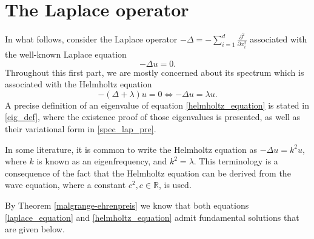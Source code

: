 \section{The Laplace operator}
\label{section:laplace_op}

In what follows, consider the Laplace operator \(-\Delta = -\sum_{i=1}^{d} \frac{\partial^2}{\partial x_i^2}\) associated with the well-known Laplace equation
\begin{equation} \label{laplace_equation}
    -\Delta u = 0.
\end{equation}
Throughout this first part, we are mostly concerned about its spectrum which is associated with the Helmholtz equation
\begin{equation} \label{helmholtz_equation}
    -(\Delta+\lambda) u = 0 \iff -\Delta u = \lambda u.
\end{equation}
A precise definition of an eigenvalue of equation \eqref{helmholtz_equation} is stated in \ref{eig_def}, where the existence proof of those eigenvalues is presented, as well as their variational form in \ref{spec_lap_pre}.
\begin{remark}
    In some literature, it is common to write the Helmholtz equation as \(-\Delta u = k^2 u\), where \(k\) is known as an eigenfrequency, and \(k^2 = \lambda\). This terminology is a consequence of the fact that the Helmholtz equation can be derived from the wave equation, where a constant \(c^2, c \in \mathbb{R}\), is used.
\end{remark}

By Theorem \ref{malgrange-ehrenpreis} we know that both equations \eqref{laplace_equation} and \eqref{helmholtz_equation} admit fundamental solutions that are given below.

